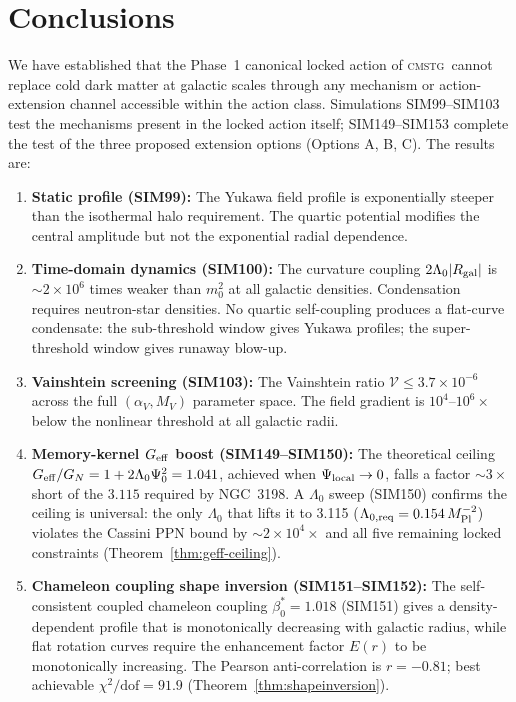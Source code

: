 \documentclass[12pt,a4paper]{article}
\newcommand{\CMSTG}{\textsc{cmstg}}
\newcommand{\Lz}{\Lambda_0}
\newcommand{\Mpl}{M_{\rm Pl}}
\newcommand{\Geff}{G_{\rm eff}}
\theoremstyle{plain}
\begin{document}
\section{Conclusions}
\label{sec:conclusions}

We have established that the Phase~1 canonical locked action of \CMSTG\
cannot replace cold dark matter at galactic scales through any mechanism
or action-extension channel accessible within the action class.
Simulations SIM99--SIM103 test the mechanisms present in the locked action
itself; SIM149--SIM153 complete the test of the three proposed extension
options (Options A, B, C). The results are:

\begin{enumerate}
  \item \textbf{Static profile (SIM99):} The Yukawa field profile is
    exponentially steeper than the isothermal halo requirement.
    The quartic potential modifies the central amplitude but not the
    exponential radial dependence.

  \item \textbf{Time-domain dynamics (SIM100):} The curvature coupling
    $2\Lz|R_{\rm gal}|$ is $\sim2\times10^6$ times weaker than $m_0^2$ at
    all galactic densities. Condensation requires neutron-star densities.
    No quartic self-coupling produces a flat-curve condensate: the
    sub-threshold window gives Yukawa profiles; the super-threshold window
    gives runaway blow-up.

  \item \textbf{Vainshtein screening (SIM103):} The Vainshtein ratio
    $\mathcal{V} \leq 3.7\times10^{-6}$ across the full $(\alpha_V, M_V)$
    parameter space. The field gradient is $10^{4}$--$10^{6}\times$ below
    the nonlinear threshold at all galactic radii.

  \item \textbf{Memory-kernel $\Geff$ boost (SIM149--SIM150):} The
    theoretical ceiling $\Geff/G_N = 1 + 2\Lz\Psi_0^2 = 1.041$, achieved
    when $\Psi_{\rm local}\to0$, falls a factor $\sim3\times$ short of the
    $3.115$ required by NGC~3198. A $\Lz$ sweep (SIM150) confirms the
    ceiling is universal: the only $\Lz$ that lifts it to 3.115
    ($\Lambda_{0,{\rm req}} = 0.154\,\Mpl^{-2}$) violates the Cassini PPN bound by
    $\sim2\times10^4\times$ and all five remaining locked constraints
    (Theorem~\ref{thm:geff-ceiling}).

  \item \textbf{Chameleon coupling shape inversion (SIM151--SIM152):} The
    self-consistent coupled chameleon coupling $\beta_0^* = 1.018$ (SIM151)
    gives a density-dependent profile that is monotonically decreasing with
    galactic radius, while flat rotation curves require the enhancement factor
    $E(r)$ to be monotonically increasing.  The Pearson anti-correlation is
    $r = -0.81$; best achievable $\chi^2/\mathrm{dof} = 91.9$
    (Theorem~\ref{thm:shapeinversion}).


\end{enumerate}
\end{document}
